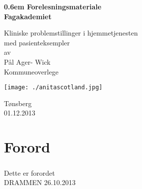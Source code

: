 \documentclass[12pt]{memoir} %
\begin{document}
			\renewcommand{\chaptername}{Del}
            \renewcommand{\contentsname}{Innhold}
            \renewcommand\listfigurename{Illustrasjoner}
            \renewcommand\tablename{Tabell}
			\renewcommand\listtablename{Tabeller}
            \renewcommand{\figurename}{Illustrasjon}


\frontmatter

	\newcommand\nbvspace[1][3]{\vspace*{\stretch{#1}}}
	\newcommand\nbstretchyspace{\spaceskip0.5em plus 0.25em minus 0.25em}
	\newcommand{\nbtitlestretch}{\spaceskip0.6em}
	\pagestyle{empty}
	\begin{center}
	\bfseries
	\nbvspace[1]
	\Huge
	{\nbtitlestretch\huge
	Forelesningsmateriale\\ Fagakademiet}

	\nbvspace[1]
	\normalsize

	Kliniske problemstillinger i hjemmetjenesten\\
	med pasienteksempler\\
	\nbvspace[1]
	\small av\\
	\Large Pål Ager- Wick\\[0.5em]
	\footnotesize Kommuneoverlege\\

	\nbvspace[2]

	\texttt{[image: ./anitascotland.jpg]}
	\nbvspace[3]
	\normalsize

	Tønsberg\\
	\large
	01.12.2013\\
	\nbvspace[1]
	\end{center}


		\chapter{Forord}%
			\paragraph{}
				Dette er forordet
				\\[0.7in]



				DRAMMEN 26.10.2013\\[0.4in]
\end{document}
